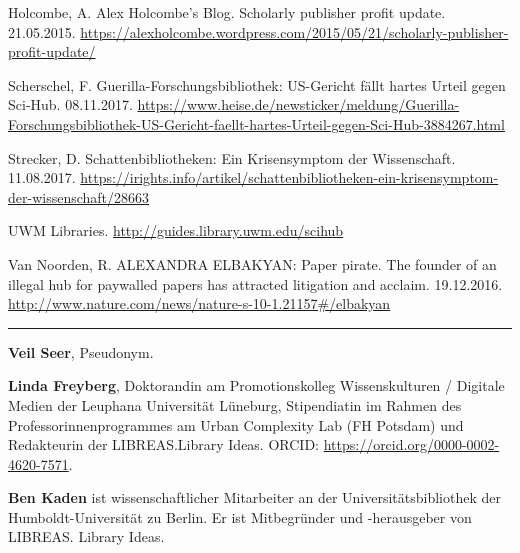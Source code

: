\documentclass[a4paper,
fontsize=11pt,
oneside,
numbers=noperiodatend,
parskip=half-,
bibliography=totoc,
final
]{scrartcl}
\begin{document}
Holcombe, A. Alex Holcombe's Blog. Scholarly publisher profit update.
21.05.2015.
\url{https://alexholcombe.wordpress.com/2015/05/21/scholarly-publisher-profit-update/}

Scherschel, F. Guerilla-Forschungsbibliothek: US-Gericht fällt hartes
Urteil gegen Sci-Hub. 08.11.2017.
\url{https://www.heise.de/newsticker/meldung/Guerilla-Forschungsbibliothek-US-Gericht-faellt-hartes-Urteil-gegen-Sci-Hub-3884267.html}

Strecker, D. Schattenbibliotheken: Ein Krisensymptom der Wissenschaft.
11.08.2017.
\url{https://irights.info/artikel/schattenbibliotheken-ein-krisensymptom-der-wissenschaft/28663}

UWM Libraries. \url{http://guides.library.uwm.edu/scihub}

Van Noorden, R. ALEXANDRA ELBAKYAN: Paper pirate. The founder of an
illegal hub for paywalled papers has attracted litigation and acclaim.
19.12.2016.
\url{http://www.nature.com/news/nature-s-10-1.21157\#/elbakyan}

\begin{center}\rule{0.5\linewidth}{\linethickness}\end{center}

\textbf{Veil Seer}, Pseudonym.

\textbf{Linda Freyberg}, Doktorandin am Promotionskolleg Wissenskulturen
/ Digitale Medien der Leuphana Universität Lüneburg, Stipendiatin im
Rahmen des Professorinnenprogrammes am Urban Complexity Lab (FH Potsdam)
und Redakteurin der LIBREAS.Library Ideas. ORCID:
\url{https://orcid.org/0000-0002-4620-7571}.

\textbf{Ben Kaden} ist wissenschaftlicher Mitarbeiter an der
Universitätsbibliothek der Hum\-boldt-Uni\-ver\-si\-tät zu Berlin. Er ist
Mitbegründer und -herausgeber von LIBREAS. Library Ideas.
\end{document}

